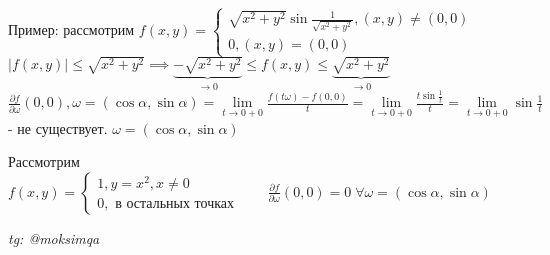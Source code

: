 \documentclass[../main.tex]{subfiles}
\begin{document}
Пример: рассмотрим $f(x,y) = \begin{cases}
    \sqrt{x^{2}+y^{2}} \sin{\frac{1}{\sqrt{x^{2}+y^{2}}}},(x,y) \neq (0,0) \\
    0, (x,y) = (0,0)
\end{cases}$\\
\vspace{0.2cm}
$|f(x,y)|\leqslant \sqrt{x^{2}+y^{2}}\implies \underbrace{-\sqrt{x^{2}+y^{2}}}_{\to 0}\leqslant f(x,y)\leqslant \underbrace{\sqrt{x^{2}+y^{2}}}_{\to 0}$
\\ $\frac{\partial{f}}{\partial{\omega}}(0,0), \omega = (\cos{\alpha},\sin{\alpha})= \lim\limits_{t \to 0+0} \frac{f(t\omega)-f(0,0)}{t} = \lim\limits_{t \to 0+0} \frac{t\sin{\frac{1}{t}}}{t} =\lim\limits_{t\to 0+0} \sin{\frac{1}{t}}$ - не существует. $\omega = (\cos{\alpha},\sin{\alpha})$

Рассмотрим $f(x,y) = \begin{cases}
    1, y= x^{2} ,x\neq 0 \\
    0, \text{ в остальных точках}
\end{cases} \qquad \frac{\partial{f}}{\partial{\omega}}(0,0)=0\; \forall \omega = (\cos{\alpha},\sin{\alpha})$ 

\vspace{1cm}
\begin{flushright}
    \textit{tg: @moksimqa}
\end{flushright}
\end{document}

